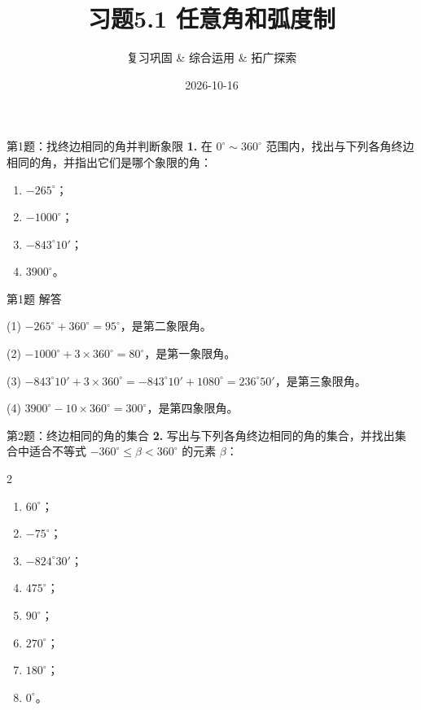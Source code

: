 \documentclass[10pt,aspectratio=169,serif]{beamer}
\title[习题5.1]{习题5.1 任意角和弧度制}
\subtitle{复习巩固 \& 综合运用 \& 拓广探索}
\author{}
\institute{}
\date{2026-10-16}
\begin{document}
\begin{frame}
  \titlepage
\end{frame}

\begin{frame}[t]{第1题：找终边相同的角并判断象限}
\textbf{1.} 在 $0^\circ\sim 360^\circ$ 范围内，找出与下列各角终边相同的角，并指出它们是哪个象限的角：
\begin{enumerate}
  \item $-265^\circ$；
  \item $-1000^\circ$；
  \item $-843^\circ 10'$；
  \item $3900^\circ$。
\end{enumerate}
\end{frame}

\begin{frame}[t]{第1题 解答}
\begin{tcolorbox}[colback=orange!10,colframe=orange,title=\textbf{解}]
(1) $-265^\circ + 360^\circ = 95^\circ$，是\alert{第二象限角}。

(2) $-1000^\circ + 3\times 360^\circ = 80^\circ$，是\alert{第一象限角}。

(3) $-843^\circ 10' + 3\times 360^\circ = -843^\circ 10' + 1080^\circ = 236^\circ 50'$，是\alert{第三象限角}。

(4) $3900^\circ - 10\times 360^\circ = 300^\circ$，是\alert{第四象限角}。
\end{tcolorbox}
\end{frame}

\begin{frame}[t]{第2题：终边相同的角的集合}
\textbf{2.} 写出与下列各角终边相同的角的集合，并找出集合中适合不等式 $-360^\circ\le\beta<360^\circ$ 的元素 $\beta$：
\begin{multicols}{2}
\begin{enumerate}
  \item $60^\circ$；
  \item $-75^\circ$；
  \item $-824^\circ 30'$；
  \item $475^\circ$；
  \item $90^\circ$；
  \item $270^\circ$；
  \item $180^\circ$；
  \item $0^\circ$。
\end{enumerate}
\end{multicols}
\end{frame}
\end{document}
